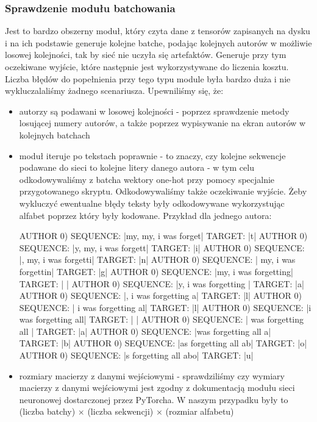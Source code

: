 \subsubsection{Sprawdzenie modułu batchowania}
	  Jest to bardzo obszerny moduł, który czyta dane z tensorów zapisanych na dysku
	  i na ich podstawie generuje kolejne batche, podając kolejnych autorów w możliwie losowej kolejności, tak by sieć
	  nie uczyła się artefaktów. Generuje przy tym oczekiwane wyjście, które następnie jest wykorzystywane do
	  liczenia kosztu. Liczba błędów do popełnienia przy tego typu module była bardzo duża i nie wykluczalaliśmy
	  żadnego scenariusza. Upewniliśmy się, że:
	\begin{itemize}
	  \item {autorzy są podawani w losowej kolejności - poprzez sprawdzenie metody losującej numery autorów,
	  a także poprzez wypisywanie na ekran autorów w kolejnych batchach}
	  \item {moduł iteruje po tekstach poprawnie - to znaczy, czy kolejne sekwencje podawane do sieci to
	  kolejne litery danego autora - w tym celu odkodowywaliśmy z batcha wektory one-hot przy pomocy
	  specjalnie przygotowanego skryptu. Odkodowywaliśmy także oczekiwanie wyjście. Żeby wykluczyć ewentualne błędy
	  teksty były odkodowywane wykorzystując alfabet poprzez który były kodowane.
	  Przykład dla jednego autora:
\begin{bash}
AUTHOR 0) SEQUENCE: |my, my, i was forget|     TARGET: |t|
AUTHOR 0) SEQUENCE: |y, my, i was forgett|     TARGET: |i|
AUTHOR 0) SEQUENCE: |, my, i was forgetti|     TARGET: |n|
AUTHOR 0) SEQUENCE: | my, i was forgettin|     TARGET: |g|
AUTHOR 0) SEQUENCE: |my, i was forgetting|     TARGET: | |
AUTHOR 0) SEQUENCE: |y, i was forgetting |     TARGET: |a|
AUTHOR 0) SEQUENCE: |, i was forgetting a|     TARGET: |l|
AUTHOR 0) SEQUENCE: | i was forgetting al|     TARGET: |l|
AUTHOR 0) SEQUENCE: |i was forgetting all|     TARGET: | |
AUTHOR 0) SEQUENCE: | was forgetting all |     TARGET: |a|
AUTHOR 0) SEQUENCE: |was forgetting all a|     TARGET: |b|
AUTHOR 0) SEQUENCE: |as forgetting all ab|     TARGET: |o|
AUTHOR 0) SEQUENCE: |s forgetting all abo|     TARGET: |u|
\end{bash} }
	  \item {rozmiary macierzy z danymi wejściowymi - sprawdziliśmy czy wymiary macierzy z danymi wejściowymi jest zgodny
	  z dokumentacją modułu sieci neuronowej dostarczonej przez PyTorcha. W naszym przypadku były to
	  (liczba batchy) $\times$ (liczba sekwencji) $\times$ (rozmiar alfabetu) }
	\end{itemize}

